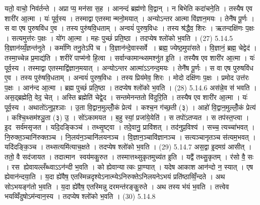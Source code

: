 यतो॒ वाचो॒ निव॑र्तन्ते । अप्राप्य॒ मन॑सा स॒ह । आनन्दं ब्रह्म॑णो वि॒द्वान् । न बिभेति कदा॑चने॒ति । तस्यैष एव शारी॑र आ॒त्मा । यः॑ पूर्व॒स्य । तस्माद्वा एतस्मान्मनो॒मयात् । अन्योऽन्तर आत्मा वि॑ज्ञान॒मयः । तेनै॑ष पू॒र्णः । स वा एष पुरुषवि॑ध ए॒व । तस्य पुरु॑षवि॒धताम् । अन्वयं॑ पुरुष॒विधः । तस्य श्र॑द्धैव॒ शिरः । ऋतन्दक्षि॑णः प॒क्षः । सत्यमुत्त॑रः प॒क्षः । यो॑ग आ॒त्मा । महः पुच्छं॑ प्रति॒ष्ठा । तदप्येष श्लो॑को भ॒वति । (27)
5.14.5
वि॒ज्ञान॑य्यँ॒ज्ञन्त॑नुते । कर्मा॑णि तनु॒तेऽपि॑ च । वि॒ज्ञान॑न्दे॒वास्सर्वे । ब्रह्म॒ ज्येष्ठ॒मुपा॑सते । वि॒ज्ञानं॒ ब्रह्म॒ चेद्वेद॑ । तस्मा॒च्चेन्न प्र॒माद्य॑ति । शरीरे॑ पाप्म॑नो हि॒त्वा । सर्वान्कामान्थ्समश्नु॑त इ॒ति । तस्यैष एव शारी॑र आ॒त्मा । यः॑ पूर्व॒स्य । तस्माद्वा एतस्माद्वि॑ज्ञान॒मयात् । अन्योऽन्तर आत्मा॑ऽऽनन्द॒मयः । तेनै॑ष पू॒र्णः । स वा एष पुरुषवि॑ध ए॒व । तस्य पुरु॑षवि॒धताम् । अन्वयं॑ पुरुष॒विधः । तस्य प्रिय॑मेव॒ शिरः । मोदो दक्षि॑णः प॒क्षः । प्रमोद उत्त॑रः प॒क्षः । आन॑न्द आ॒त्मा । ब्रह्म पुच्छं॑ प्रति॒ष्ठा । तदप्येष श्लो॑को भ॒वति । (28)
5.14.6
अस॑न्ने॒व स॑ भवति । अस॒द्ब्रह्मेति॒ वेद॒ चेत् । अस्ति ब्रह्मेति॑ चेद्वे॒द । सन्तमेनन्ततो वि॑दुरि॒ति । तस्यैष एव शारी॑र आ॒त्मा । यः॑ पूर्व॒स्य । अथातो॑ऽनुप्र॒श्ञाः । उ॒ता वि॒द्वान॒मुल्लोँ॒कं प्रेत्य॑ । कश्च॒न ग॑च्छ॒ती (३) । आहो॑ वि॒द्वान॒मुल्लोँ॒कं प्रेत्य॑ । कश्चि॒थ्सम॑श्ञु॒ता (३) उ॒ । सो॑ऽकामयत । ब॒हु स्यां॒ प्रजा॑ये॒येति॑ । स तपो॑ऽतप्यत । स तप॑स्त॒प्त्वा । इ॒द सर्व॑मसृजत । यदि॒दङ्किञ्च॑ । तथ्सृ॒ष्ट्वा । तदे॒वानु॒ प्रावि॑शत् । तद॑नुप्र॒विश्य॑ । सच्च॒ त्यच्चा॑भवत् । नि॒रुक्त॒ञ्चानि॑रुक्तञ्च । नि॒लय॑न॒ञ्चानि॑लयनञ्च । वि॒ज्ञान॒ञ्चावि॑ज्ञानञ्च । सत्यञ्चानृतञ्च स॑त्यम॒भवत् । यदि॑दङ्कि॒ञ्च । तथ्सत्यमि॑त्याच॒क्षते । तदप्येष श्लो॑को भ॒वति । (29)
5.14.7
अस॒द्वा इ॒दमग्र॑ आसीत् । ततो॒ वै सद॑जायत । तदात्मान स्वय॑मकु॒रुत । तस्मात्तथ्सुकृतमुच्य॑त इ॒ति । यद्वै॑ तथ्सु॒कृतम् । र॑सो वै॒ सः । रस ह्येवायल्लँब्ध्वाऽऽन॑न्दी भ॒वति । को ह्येवान्यात्कः प्रा॒ण्यात् । यदेष आकाश आन॑न्दो न॒ स्यात् । एष ह्येवान॑न्दया॒ति । य॒दा ह्ये॑वैष॒ एतस्मिन्नदृश्येऽनात्म्येऽनिरुक्तेऽनिलयनेऽभयं प्रति॑ष्ठाव्विँ॒न्दते । अथ सोऽभयङ्ग॑तो भ॒वति । य॒दा ह्ये॑वैष॒ एतस्मिन्नु दरमन्त॑रङ्कु॒रुते । अथ तस्य भ॑यं भ॒वति । तत्त्वेव भयव्विँदुषोऽम॑न्वान॒स्य । तदप्येष श्लो॑को भ॒वति । (30)
5.14.8

